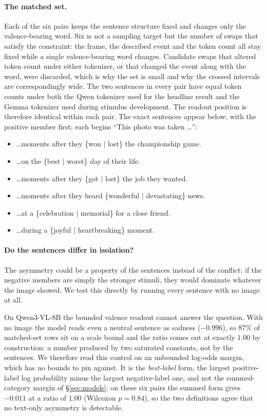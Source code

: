 \documentclass{article}
\newcommand{\qwen}{Qwen3-VL-8B}
\begin{document}
\paragraph{The matched set.}
Each of the six pairs keeps the sentence structure fixed and changes only the valence-bearing word. Six is not a sampling target but the number of swaps that satisfy the constraint: the frame, the described event and the token count all stay fixed while a single valence-bearing word changes. Candidate swaps that altered token count under either tokenizer, or that changed the event along with the word, were discarded, which is why the set is small and why the crossed intervals are correspondingly wide. The two sentences in every pair have equal token counts under both the Qwen tokenizer used for the headline result and the Gemma tokenizer used during stimulus development. The readout position is therefore identical within each pair. The exact sentences appear below, with the positive member first; each begins ``This photo was taken \ldots'':
\begin{itemize}\setlength\itemsep{0pt}
  \item[mp0] \ldots moments after they \{won $\mid$ lost\} the championship game.
  \item[mp1] \ldots on the \{best $\mid$ worst\} day of their life.
  \item[mp2] \ldots moments after they \{got $\mid$ lost\} the job they wanted.
  \item[mp3] \ldots moments after they heard \{wonderful $\mid$ devastating\} news.
  \item[mp4] \ldots at a \{celebration $\mid$ memorial\} for a close friend.
  \item[mp5] \ldots during a \{joyful $\mid$ heartbreaking\} moment.
\end{itemize}
\paragraph{Do the sentences differ in isolation?}
The asymmetry could be a property of the sentences instead of the conflict: if the negative members are simply the stronger stimuli, they would dominate whatever the image showed. We test this directly by running every sentence with no image at all.

On \qwen{} the bounded valence readout cannot answer the question. With no image the model reads even a neutral sentence as sadness ($-0.996$), so $87\%$ of matched-set rows sit on a scale bound and the ratio comes out at exactly $1.00$ by construction: a number produced by two saturated constants, not by the sentences. We therefore read this control on an unbounded log-odds margin, which has no bounds to pin against. It is the \emph{best-label} form, the largest positive-label log probability minus the largest negative-label one, and not the summed-category margin of \S\ref{sec:models}; on these six pairs the summed form gives $-0.011$ at a ratio of $1.00$ (Wilcoxon $p=0.84$), so the two definitions agree that no text-only asymmetry is detectable.
\end{document}
